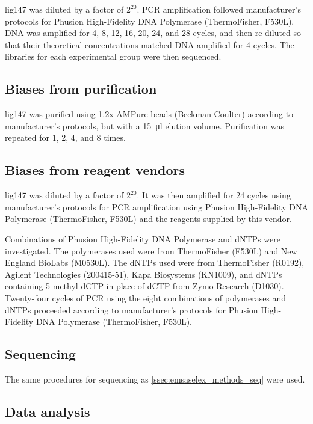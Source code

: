 \documentclass[a4paper, numbers=noenddot]{scrbook}
\begin{document}
lig147 was diluted by a factor of $2^{20}$.  PCR amplification followed manufacturer's protocols for Phusion High-Fidelity DNA Polymerase (ThermoFisher, F530L).  DNA was amplified for 4, 8, 12, 16, 20, 24, and 28 cycles, and then re-diluted so that their theoretical concentrations matched DNA amplified for 4 cycles.  The libraries for each experimental group were then sequenced.

\subsection{Biases from purification}
\label{ssec:pcrbias_methods_pur}

lig147 was purified using 1.2x AMPure beads (Beckman Coulter) according to manufacturer's protocols, but with a \SI{15}{\micro\litre} elution volume.  Purification was repeated for 1, 2, 4, and 8 times.

\subsection{Biases from reagent vendors}
\label{ssec:pcrbias_methods_reagent}

lig147 was diluted by a factor of $2^{20}$.  It was then amplified for 24 cycles using manufacturer's protocols for PCR amplification using Phusion High-Fidelity DNA Polymerase (ThermoFisher, F530L) and the reagents supplied by this vendor.

Combinations of Phusion High-Fidelity DNA Polymerase and dNTPs were investigated.  The polymerases used were from ThermoFisher (F530L) and New England BioLabs (M0530L).  The dNTPs used were from ThermoFisher (R0192), Agilent Technologies (200415-51), Kapa Biosystems (KN1009), and dNTPs containing 5-methyl dCTP in place of dCTP from Zymo Research (D1030).  Twenty-four cycles of PCR using the eight combinations of polymerases and dNTPs proceeded according to manufacturer's protocols for Phusion High-Fidelity DNA Polymerase (ThermoFisher, F530L).

\subsection{Sequencing}
\label{ssec:pcrbias_methods_seq}

The same procedures for sequencing as \ref{ssec:emsaselex_methods_seq} were used.

\subsection{Data analysis}
\label{ssec:pcrbias_methods_anal}
\end{document}
